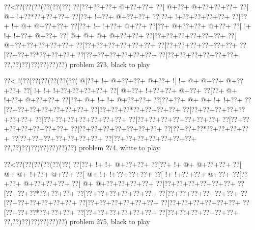\vbox{\vbox{\goo
\0??<\0??(\0??(\0??(\0??(\0??(\0??(
\0??[\0??+\0??+\0??+\- @+\0??+\0??+
\0??[\- @+\0??+\- @+\0??+\0??+\0??+
\0??[\- @+\- !+\0??*\0??+\0??+\0??+
\0??[\0??+\- !+\0??+\- @+\0??+\0??+
\0??[\0??+\- !+\0??+\0??+\0??+\0??+
\0??[\0??+\- !+\- @+\- @+\0??+\0??+
\0??[\0??+\- !+\- !+\0??+\- @+\0??+
\0??[\0??+\- @+\0??+\0??+\- @+\0??+
\0??[\- !+\- !+\- !+\0??+\- @+\0??+
\0??[\- @+\- @+\- @+\- @+\0??+\0??+
\0??[\0??+\0??+\0??+\0??+\0??+\0??+
\0??[\- @+\0??+\0??+\0??+\0??+\0??+
\0??[\0??+\0??+\0??+\0??+\0??+\0??+
\0??[\0??+\0??+\0??+\0??+\0??+\0??+
\0??[\0??+\0??+\0??*\0??+\0??+\0??+
\0??[\0??+\0??+\0??+\0??+\0??+\0??+
\0??[\0??+\0??+\0??+\0??+\0??+\0??+
\0??,\0??)\0??)\0??)\0??)\0??)\0??)
}
\hfil problem 273, black to play\hfil\break
}

\vbox{\vbox{\goo
\0??<\- !(\0??(\0??(\0??(\0??(\0??(\0??(
\- @[\0??+\- !+\- @+\0??+\0??+\- @+\0??+
\- ![\- !+\- @+\- @+\0??+\- @+\0??+\0??+
\0??[\- !+\- !+\- !+\0??+\0??+\0??+\0??+
\0??[\- @+\0??+\- !+\0??+\0??+\- @+\0??+
\0??[\0??+\- @+\- !+\0??+\- @+\0??+\0??+
\0??[\0??+\- @+\- !+\- !+\- @+\0??+\0??+
\0??[\0??+\0??+\- @+\- @+\- !+\- !+\0??+
\0??[\0??+\0??+\0??+\0??+\0??+\0??+\0??+
\0??[\0??+\0??+\0??*\0??+\0??+\0??+\0??+
\0??[\0??+\0??+\0??+\0??+\0??+\0??+\0??+
\0??[\0??+\0??+\0??+\0??+\0??+\0??+\0??+
\0??[\0??+\0??+\0??+\0??+\0??+\0??+\0??+
\0??[\0??+\0??+\0??+\0??+\0??+\0??+\0??+
\0??[\0??+\0??+\0??+\0??+\0??+\0??+\0??+
\0??[\0??+\0??+\0??*\0??+\0??+\0??+\0??+
\0??[\0??+\0??+\0??+\0??+\0??+\0??+\0??+
\0??[\0??+\0??+\0??+\0??+\0??+\0??+\0??+
\0??,\0??)\0??)\0??)\0??)\0??)\0??)\0??)
}
\hfil problem 274, white to play\hfil\break
}

\vbox{\vbox{\goo
\0??<\0??(\0??(\0??(\0??(\0??(\0??(
\0??[\0??+\- !+\- !+\- @+\0??+\0??+
\0??[\0??+\- !+\- @+\- @+\0??+\0??+
\0??[\- @+\- @+\- !+\0??+\- @+\0??+
\0??[\- @+\- !+\- !+\0??+\0??+\0??+
\0??[\- !+\- !+\0??+\0??+\- @+\0??+
\0??[\0??+\0??+\- @+\0??+\0??+\0??+
\0??[\- @+\- @+\0??+\0??+\0??+\0??+
\0??[\0??+\0??+\0??+\0??+\0??+\0??+
\0??[\0??+\0??+\0??*\0??+\0??+\0??+
\0??[\0??+\0??+\0??+\0??+\0??+\0??+
\0??[\0??+\0??+\0??+\0??+\0??+\0??+
\0??[\0??+\0??+\0??+\0??+\0??+\0??+
\0??[\0??+\0??+\0??+\0??+\0??+\0??+
\0??[\0??+\0??+\0??+\0??+\0??+\0??+
\0??[\0??+\0??+\0??*\0??+\0??+\0??+
\0??[\0??+\0??+\0??+\0??+\0??+\0??+
\0??[\0??+\0??+\0??+\0??+\0??+\0??+
\0??,\0??)\0??)\0??)\0??)\0??)\0??)
}
\hfil problem 275, black to play\hfil\break
}

